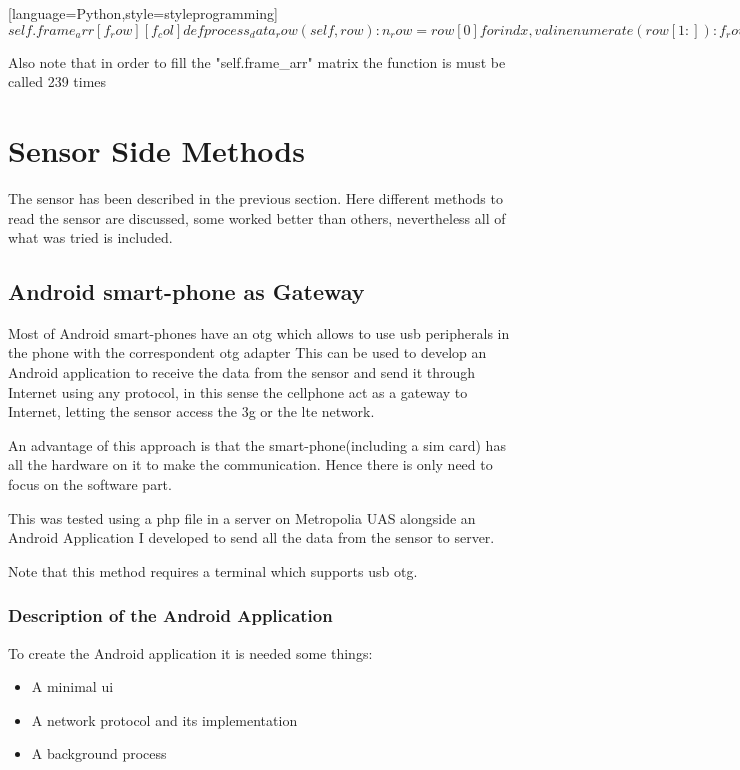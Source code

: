\documentclass[hidelinks,11pt,a4paper,oneside,article]{memoir}
\begin{document}
[language=Python,style=styleprogramming]$
self.frame_arr[f_row][f_col]

def process_data_row(self, row):
    n_row = row[0]
    
    for indx, val in enumerate(row[1:]):
        f_row = (n_row)/2
        f_col = (n_row) %
        self.frame_arr[f_row][f_col] = val
$ 

Also note that in order to fill the "self.frame{\_}arr" matrix the function is must be called 239 times

\section{Sensor Side Methods}
The sensor has been described in the previous section. Here different methods to read the sensor are discussed, some worked better than others, nevertheless all of what was tried is included.

\subsection{Android smart-phone as Gateway}
Most of Android smart-phones have an \gls{otg} which allows to use \gls{usb} peripherals in the phone with the correspondent \gls{otg} adapter This can be used to develop an Android application to receive the data from the sensor and send it through Internet using any protocol, in this sense the cellphone act as a gateway to Internet, letting the sensor access the \gls{3g} or the \gls{lte} network.

An advantage of this approach is that the smart-phone(including a \gls{sim} card) has all the hardware on it to make the communication. Hence there is only need to focus on the software part.

This was tested using a \gls{php} file in a server on Metropolia UAS alongside an Android Application I developed to send all the data from the sensor to server.

Note that this method requires  a terminal which supports \gls{usb} \gls{otg}.

\subsubsection{Description of the Android Application}
To create the Android application it is needed some things:
\begin{itemize}
	\item A minimal \gls{ui}
	\item A network protocol and its implementation
	\item A background process
\end{itemize}
\end{document}
